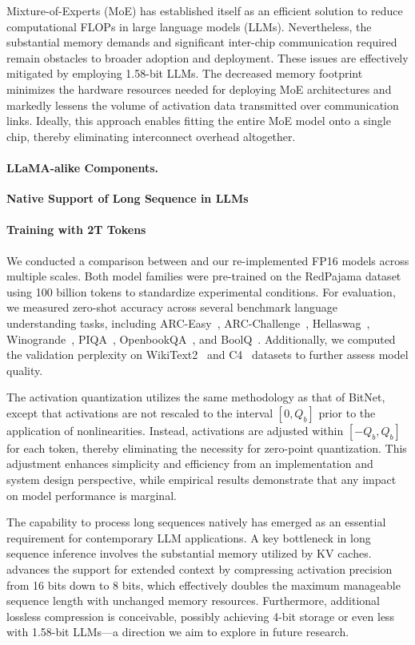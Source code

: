 Mixture-of-Experts (MoE) has established itself as an efficient solution to reduce computational FLOPs in large language models (LLMs). Nevertheless, the substantial memory demands and significant inter-chip communication required remain obstacles to broader adoption and deployment. These issues are effectively mitigated by employing 1.58-bit LLMs. The decreased memory footprint minimizes the hardware resources needed for deploying MoE architectures and markedly lessens the volume of activation data transmitted over communication links. Ideally, this approach enables fitting the entire MoE model onto a single chip, thereby eliminating interconnect overhead altogether.

\paragraph{LLaMA-alike Components.}

\textbf{Native Support of Long Sequence in LLMs}

\paragraph{Training with 2T Tokens}

We conducted a comparison between  and our re-implemented FP16  models across multiple scales. Both model families were pre-trained on the RedPajama dataset~\cite{redpajama} using 100 billion tokens to standardize experimental conditions. For evaluation, we measured zero-shot accuracy across several benchmark language understanding tasks, including ARC-Easy~\cite{arc}, ARC-Challenge~\cite{arc}, Hellaswag~\cite{hellaswag}, Winogrande~\cite{winoGrande}, PIQA~\cite{piqa}, OpenbookQA~\cite{openbookqa}, and BoolQ~\cite{boolq}. Additionally, we computed the validation perplexity on WikiText2~\cite{wikitext2} and C4~\cite{c4} datasets to further assess model quality.

The activation quantization utilizes the same methodology as that of BitNet, except that activations are not rescaled to the interval $[0, Q_b]$ prior to the application of nonlinearities. Instead, activations are adjusted within $[-Q_b, Q_b]$ for each token, thereby eliminating the necessity for zero-point quantization. This adjustment enhances simplicity and efficiency from an implementation and system design perspective, while empirical results demonstrate that any impact on model performance is marginal.

The capability to process long sequences natively has emerged as an essential requirement for contemporary LLM applications. A key bottleneck in long sequence inference involves the substantial memory utilized by KV caches.  advances the support for extended context by compressing activation precision from 16 bits down to 8 bits, which effectively doubles the maximum manageable sequence length with unchanged memory resources. Furthermore, additional lossless compression is conceivable, possibly achieving 4-bit storage or even less with 1.58-bit LLMs—a direction we aim to explore in future research.

